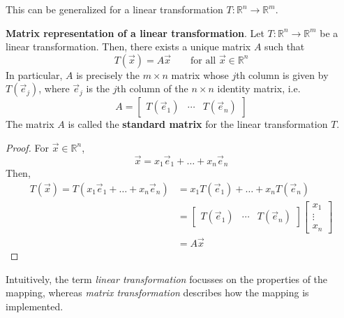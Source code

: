 \documentclass[letterpaper,12pt]{article}
\begin{document}
This can be generalized for a linear transformation $T: \mathbb{R}^n \rightarrow \mathbb{R}^m$.

\begin{theorem}
\textbf{Matrix representation of a linear transformation}. Let $T: \mathbb{R}^n \rightarrow \mathbb{R}^m$ be a linear transformation. Then, there exists a unique matrix $A$ such that
\begin{equation*}
    T(\vec{x}) = A\vec{x} \qquad \text{for all $\vec{x} \in \mathbb{R}^n$}
\end{equation*}
In particular, $A$ is precisely the $m \times n$ matrix whose $j$th column is given by $T(\vec{e}_j)$, where $\vec{e}_j$ is the $j$th column of the $n \times n$ identity matrix, i.e.
\begin{equation*}
    A = \begin{bmatrix} T(\vec{e}_1) & \cdots & T(\vec{e}_n) \end{bmatrix}
\end{equation*}
The matrix $A$ is called the \textbf{standard matrix} for the linear transformation $T$.
\end{theorem}

\begin{proof}
For $\vec{x} \in \mathbb{R}^n$,
\begin{equation*}
    \vec{x} = x_1 \vec{e}_1 + \dots + x_n \vec{e}_n
\end{equation*}
Then,
\begin{align*}
    T(\vec{x}) = T(x_1 \vec{e}_1 + \dots + x_n \vec{e}_n) & = x_1 T(\vec{e}_1) + \dots + x_n T(\vec{e}_n) \\
    & = \begin{bmatrix} T(\vec{e}_1) & \cdots & T(\vec{e}_n) \end{bmatrix} \begin{bmatrix} x_1 \\ \vdots \\ x_n \end{bmatrix} \\
    & = A\vec{x}
\end{align*}
\end{proof}

Intuitively, the term \textit{linear transformation} focusses on the properties of the mapping, whereas \textit{matrix transformation} describes how the mapping is implemented.
\end{document}
